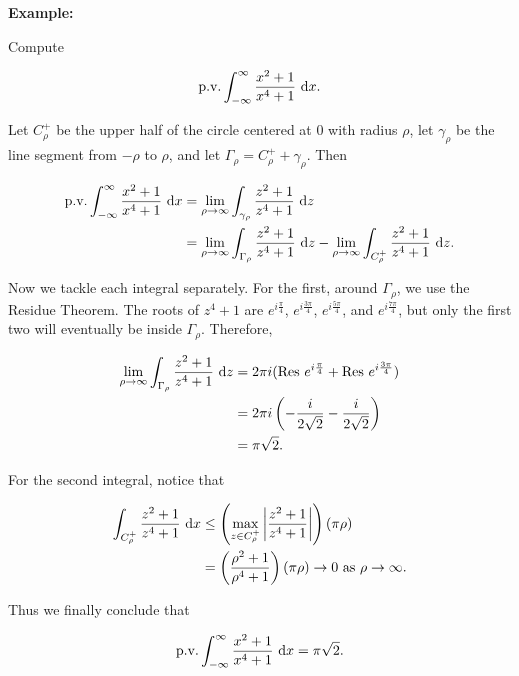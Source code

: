 \documentclass{article}
\theoremstyle{colontheorem}
\newcommand{\Res}{\textnormal{Res}}
\newcommand{\pv}{\textnormal{p.v.}}
\newenvironment{Example}
{
	\begin{mdframed}
	\textbf{Example:}%
}
{
	\end{mdframed}
	
	\vspace{.15in}
}
\begin{document}
\begin{Example}
	Compute
	
	$$
		\pv \int_{-\infty}^{\infty} \frac{x^2 + 1}{x^4 + 1}\ \textnormal{d}x.
	$$
	
	Let $C_\rho^+$ be the upper half of the circle centered at $0$ with radius $\rho$, let $\gamma_\rho$ be the line segment from $-\rho$ to $\rho$, and let $\Gamma_\rho = C_\rho^+ + \gamma_\rho$. Then
	
	\begin{align*}
			\pv \int_{-\infty}^{\infty} \frac{x^2 + 1}{x^4 + 1}\ \textnormal{d}x &= \lim\limits_{\rho \to \infty} \int_{\gamma_\rho} \frac{z^2 + 1}{z^4 + 1}\ \textnormal{d}z\\
			&= \lim\limits_{\rho \to \infty} \int_{\Gamma_\rho} \frac{z^2 + 1}{z^4 + 1}\ \textnormal{d}z - \lim\limits_{\rho \to \infty} \int_{C_\rho^+} \frac{z^2 + 1}{z^4 + 1}\ \textnormal{d}z.
	\end{align*}
	
	Now we tackle each integral separately. For the first, around $\Gamma_\rho$, we use the Residue Theorem. The roots of  $z^4 + 1$ are $e^{i\frac{\pi}{4}}$, $e^{i\frac{3\pi}{4}}$, $e^{i\frac{5\pi}{4}}$, and $e^{i\frac{7\pi}{4}}$, but only the first two will eventually be inside $\Gamma_\rho$. Therefore,
	
	\begin{align*}
		\lim\limits_{\rho \to \infty} \int_{\Gamma_\rho} \frac{z^2 + 1}{z^4 + 1}\ \textnormal{d}z &= 2 \pi i (\Res\ e^{i\frac{\pi}{4}} + \Res\ e^{i\frac{3\pi}{4}})\\
		&= 2 \pi i \left( -\frac{i}{2\sqrt{2}} - \frac{i}{2\sqrt{2}} \right)\\
		&= \pi \sqrt{2}.
	\end{align*}
	
	For the second integral, notice that
	
	\begin{align*}
		\int_{C_\rho^+} \frac{z^2 + 1}{z^4 + 1}\ \textnormal{d}x &\leq \left( \max\limits_{z \in C_\rho^+} \left| \frac{z^2 + 1}{z^4 + 1} \right| \right) (\pi \rho)\\
		&= \left( \frac{\rho^2 + 1}{\rho^4 + 1} \right) (\pi \rho) \to 0 \textnormal{ as } \rho \to \infty.
	\end{align*}
	
	Thus we finally conclude that
	
	$$
		\pv \int_{-\infty}^{\infty} \frac{x^2 + 1}{x^4 + 1}\ \textnormal{d}x = \pi \sqrt{2}.
	$$
	
\end{Example}
\end{document}
